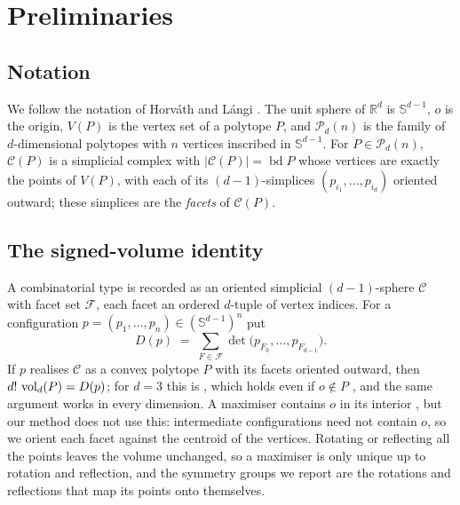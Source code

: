 \section{Preliminaries}
\label{sec:preliminaries}

\subsection{Notation}

We follow the notation of Horv\'{a}th and L\'{a}ngi
\cite[Sections~1--2]{horvath-langi-2016}. The unit sphere of $\mathbb{R}^{d}$
is $\mathbb{S}^{d-1}$, $o$ is the origin, $V(P)$ is the vertex set of a
polytope $P$, and $\mathcal{P}_{d}(n)$ is the family of $d$-dimensional
polytopes with $n$ vertices inscribed in $\mathbb{S}^{d-1}$. For
$P \in \mathcal{P}_{d}(n)$, $\mathcal{C}(P)$ is a simplicial complex with
$|\mathcal{C}(P)| = \operatorname{bd} P$ whose vertices are exactly the points
of $V(P)$, with each of its $(d-1)$-simplices $(p_{i_{1}},\dots,p_{i_{d}})$
oriented outward; these simplices are the
\emph{facets} of $\mathcal{C}(P)$.

\subsection{The signed-volume identity}

A combinatorial type is recorded as an oriented simplicial $(d-1)$-sphere
$\mathcal{C}$ with facet set $\mathcal{F}$, each facet an ordered $d$-tuple of
vertex indices. For a configuration $p = (p_{1},\dots,p_{n}) \in
(\mathbb{S}^{d-1})^{n}$ put
\begin{equation}
  \label{eq:signed-volume}
  D(p) \;=\; \sum_{F \in \mathcal{F}} \det\bigl(p_{F_{0}},\dots,p_{F_{d-1}}\bigr).
\end{equation}
If $p$ realises $\mathcal{C}$ as a convex polytope $P$ with its facets oriented
outward, then $d!\,\operatorname{vol}_{d}(P) = D(p)$; for $d = 3$ this is
\cite[Lemma~3.5]{hoehner-ledford-2026}, which holds even if $o \notin P$
\cite[Remark~3.6]{hoehner-ledford-2026}, and the same argument works in every
dimension. A maximiser contains $o$ in its interior
\cite[Lemma~3.3]{hoehner-ledford-2026}, but our method does not use this:
intermediate configurations need not contain $o$, so we orient each facet
against the centroid of the vertices.
Rotating or reflecting all the points leaves the volume unchanged, so a
maximiser is only unique up to rotation and reflection, and the symmetry groups
we report are the rotations and reflections that map its points onto
themselves.

